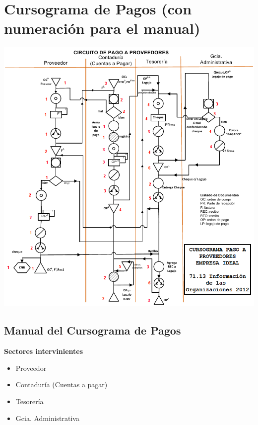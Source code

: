 \section{Cursograma de Pagos (con numeración para el manual)}
\begin{center}
 \includegraphics[scale=0.75,keepaspectratio=true]{./Circuitos-Teoricos/Pago-a-Proveedores/Images/cursograma-pago-a-proveedores-manual.png}
\end{center}

\pagebreak
\subsection{Manual del Cursograma de Pagos}

\begin{center}\textbf{Sectores intervinientes}\end{center}
\begin{itemize}
  \item Proveedor
  \item Contaduría (Cuentas a pagar)
  \item Tesorería
  \item Gcia. Administrativa
\end{itemize}

